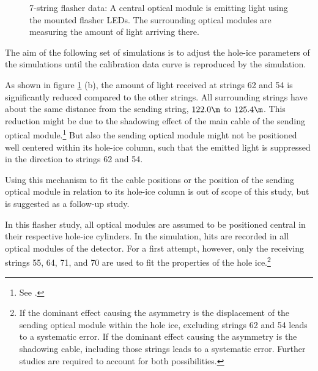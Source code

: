 \begin{figure}[htbp]
  \hfill
  \caption{7-string flasher data: A central optical module is emitting light using the mounted flasher LEDs. The surrounding optical modules are measuring the amount of light arriving there.}
  \label{fig:ea9Zieh0}
\end{figure}

The aim of the following set of simulations is to adjust the hole-ice parameters of the simulations until the calibration data curve is reproduced by the simulation.


As shown in figure \ref{fig:ea9Zieh0} (b), the amount of light received at strings 62 and 54 is significantly reduced compared to the other strings. All surrounding strings have about the same distance from the sending string, $122.0\m$ to $125.4\m$. This reduction might be due to the shadowing effect of the main cable of the sending optical module.\footnote{See .} But also the sending optical module might not be positioned well centered within its hole-ice column, such that the emitted light is suppressed in the direction to strings 62 and 54.

Using this mechanism to fit the cable positions or the position of the sending optical module in relation to its hole-ice column is out of scope of this study, but is suggested as a follow-up study.\followup

In this flasher study, all optical modules are assumed to be positioned central in their respective hole-ice cylinders. In the simulation, hits are recorded in all optical modules of the detector. For a first attempt, however, only the receiving strings 55, 64, 71, and 70 are used to fit the properties of the hole ice.\footnote{If the dominant effect causing the asymmetry is the displacement of the sending optical module within the hole ice, excluding strings 62 and 54 leads to a systematic error. If the dominant effect causing the asymmetry is the shadowing cable, including those strings leads to a systematic error. Further studies are required to account for both possibilities.}

